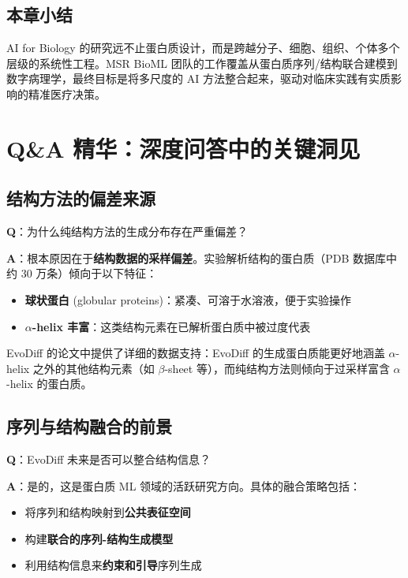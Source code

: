 \documentclass[a4paper]{article}
\begin{document}
\subsection{本章小结}

AI for Biology 的研究远不止蛋白质设计，而是跨越分子、细胞、组织、个体多个层级的系统性工程。MSR BioML 团队的工作覆盖从蛋白质序列/结构联合建模到数字病理学，最终目标是将多尺度的 AI 方法整合起来，驱动对临床实践有实质影响的精准医疗决策。


\section{Q\&A 精华：深度问答中的关键洞见}

\subsection{结构方法的偏差来源}

\textbf{Q}：为什么纯结构方法的生成分布存在严重偏差？

\textbf{A}：根本原因在于\textbf{结构数据的采样偏差}。实验解析结构的蛋白质（PDB 数据库中约 30 万条）倾向于以下特征：
\begin{itemize}
    \item \textbf{球状蛋白} (globular proteins)：紧凑、可溶于水溶液，便于实验操作
    \item \textbf{$\alpha$-helix 丰富}：这类结构元素在已解析蛋白质中被过度代表
\end{itemize}

EvoDiff 的论文中提供了详细的数据支持：EvoDiff 的生成蛋白质能更好地涵盖 $\alpha$-helix 之外的其他结构元素（如 $\beta$-sheet 等），而纯结构方法则倾向于过采样富含 $\alpha$-helix 的蛋白质。

\subsection{序列与结构融合的前景}

\textbf{Q}：EvoDiff 未来是否可以整合结构信息？

\textbf{A}：是的，这是蛋白质 ML 领域的活跃研究方向。具体的融合策略包括：
\begin{itemize}
    \item 将序列和结构映射到\textbf{公共表征空间}
    \item 构建\textbf{联合的序列-结构生成模型}
    \item 利用结构信息来\textbf{约束和引导}序列生成
\end{itemize}
\end{document}
